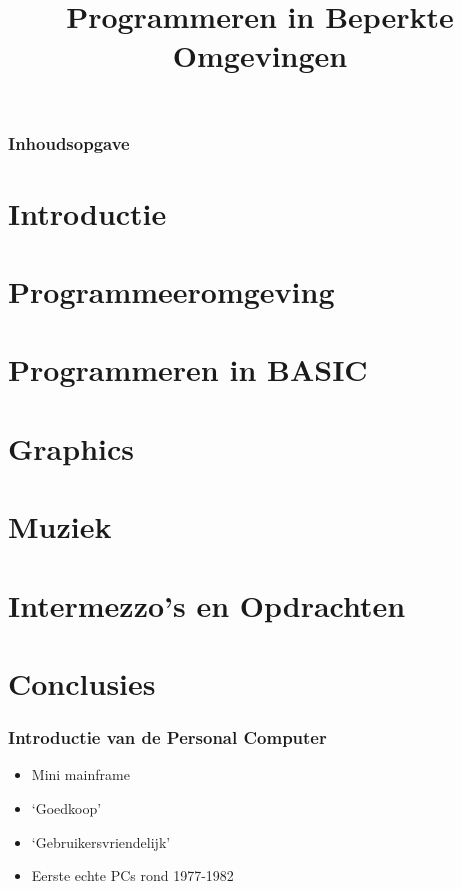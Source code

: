 \documentclass[aspectratio=43]{uva-inf-presentation}
\title{Programmeren in Beperkte Omgevingen}
\begin{document}
\begin{titelframe}
\titlepage

\end{titelframe}

\begin{frame}
\frametitle{Inhoudsopgave}
\tableofcontents
\end{frame}

\section{Introductie}
\section{Programmeeromgeving}
\section{Programmeren in BASIC}
\section{Graphics}
\section{Muziek}
\section{Intermezzo's en Opdrachten}

\section{Conclusies}


\begin{frame}
\frametitle{Introductie van de Personal Computer}

\begin{itemize}
\item Mini mainframe
\item `Goedkoop'
\item `Gebruikersvriendelijk'
\item Eerste echte PCs rond 1977-1982
\end{itemize}

\end{frame}

\end{document}
